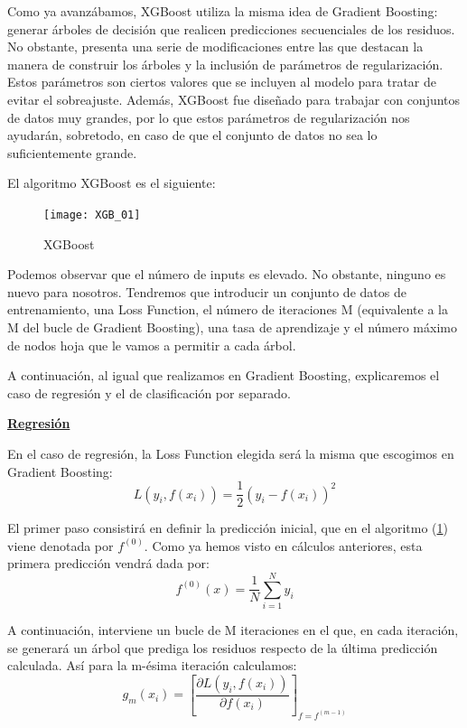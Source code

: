 \documentclass[12pt,twoside]{article}
\begin{document}
Como ya avanzábamos, XGBoost utiliza la misma idea de Gradient Boosting: generar árboles de decisión que realicen predicciones secuenciales de los residuos. No obstante, presenta una serie de modificaciones entre las que destacan la manera de construir los árboles y la inclusión de parámetros de regularización. Estos parámetros son ciertos valores que se incluyen al modelo para tratar de evitar el sobreajuste. Además, XGBoost fue diseñado para trabajar con conjuntos de datos muy grandes, por lo que estos parámetros de regularización nos ayudarán, sobretodo, en caso de que el conjunto de datos no sea lo suficientemente grande.

El algoritmo XGBoost es el siguiente:
\begin{figure}[h]
\centering
\texttt{[image: XGB\_01]}
\caption{XGBoost}
\label{fig:XGB_01}
\end{figure}

Podemos observar que el número de inputs es elevado. No obstante, ninguno es nuevo para nosotros. Tendremos que introducir un conjunto de datos de entrenamiento, una Loss Function, el número de iteraciones M (equivalente a la M del bucle de Gradient Boosting), una tasa de aprendizaje y el número máximo de nodos hoja que le vamos a permitir a cada árbol.

A continuación, al igual que realizamos en Gradient Boosting, explicaremos el caso de regresión y el de clasificación por separado.



\bigskip \bigskip \bigskip

\textbf{\underline{Regresión}}

En el caso de regresión, la Loss Function elegida será la misma que escogimos en Gradient Boosting:
\begin{equation*}
L(y_i, f(x_i)) = \frac{1}{2}(y_i - f(x_i))^2
\end{equation*}

El primer paso consistirá en definir la predicción inicial, que en el algoritmo (\ref{fig:XGB_01}) viene denotada por $f^{(0)}$. Como ya hemos visto en cálculos anteriores, esta primera predicción vendrá dada por:
\begin{equation*}
f^{(0)}(x) = \frac{1}{N} \sum_{i=1}^N y_i
\end{equation*}

A continuación, interviene un bucle de M iteraciones en el que, en cada iteración, se generará un árbol que prediga los residuos respecto de la última predicción calculada. Así para la m-ésima iteración calculamos:
\begin{equation*}
g_{m}(x_i) = \left[ \frac{\partial L(y_i, f(x_i))}{\partial f(x_i)} \right]_{f = f^{(m-1)}}
\end{equation*}
\end{document}

